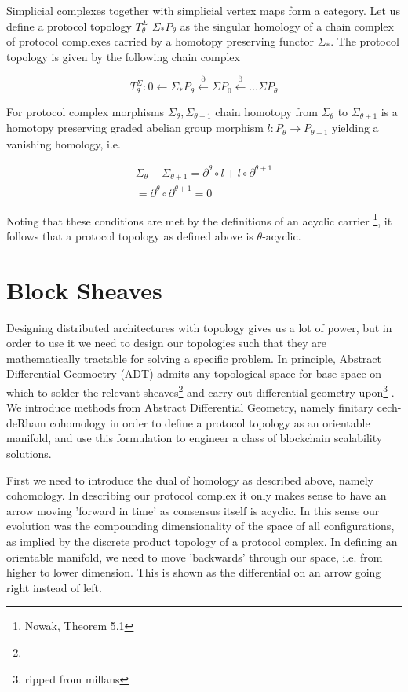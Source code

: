 \documentclass{article}
\begin{document}
Simplicial complexes together with simplicial vertex maps form a category. Let us define a protocol topology $T^{\Sigma}_\theta$ $\Sigma_{*}P_\theta$ as the singular homology of a chain complex of protocol complexes carried by a homotopy preserving functor $\Sigma_*$. The protocol topology is given by the following chain complex

\begin{equation} \label{eq1}
T^{\Sigma}_\theta: 0 \leftarrow \Sigma_{*}P_\theta \xleftarrow{\partial} \Sigma P_{0} \xleftarrow{\partial} \dots \Sigma P_\theta
\end{equation} \label{eq1}

For protocol complex morphisms $\Sigma_\theta, \Sigma_{\theta+1}$ chain homotopy from $\Sigma_\theta$ to $\Sigma_{\theta+1}$ is a homotopy preserving graded abelian group morphism $l: P_{\theta} \rightarrow P_{\theta+1}$ yielding a vanishing homology, i.e. 

\begin{equation} \label{eq1}
\begin{split}
\Sigma_\theta - \Sigma_{\theta+1} =  \partial^{\theta}\circ l + l \circ \partial^{\theta+1} \\
= \partial^\theta \circ \partial^{\theta+1} = 0
\end{split}
\end{equation}

Noting that these conditions are met by the definitions of an acyclic carrier \footnote{Nowak, Theorem 5.1}, it follows that a protocol topology as defined above is $\theta$-acyclic.

\section{Block Sheaves}
Designing distributed architectures with topology gives us a lot of power, but in order to use it we need to design our topologies such that they are mathematically tractable for solving a specific problem. In principle, Abstract Differential Geomoetry (ADT) admits any topological space for base space on which to solder the relevant sheaves\footnote{} and carry out differential geometry upon\footnote{ripped from millans} . We introduce methods from Abstract Differential Geometry, namely finitary cech-deRham cohomology in order to define a protocol topology as an orientable manifold, and use this formulation to engineer a class of blockchain scalability solutions.

First we need to introduce the dual of homology as described above, namely cohomology. In describing our protocol complex it only makes sense to have an arrow moving 'forward in time' as consensus itself is acyclic. In this sense our evolution was the compounding dimensionality of the space of all configurations, as implied by the discrete product topology of a protocol complex. In defining an orientable manifold, we need to move 'backwards' through our  space, i.e. from higher to lower dimension. This is shown as the differential on an arrow going right instead of left.
\end{document}
